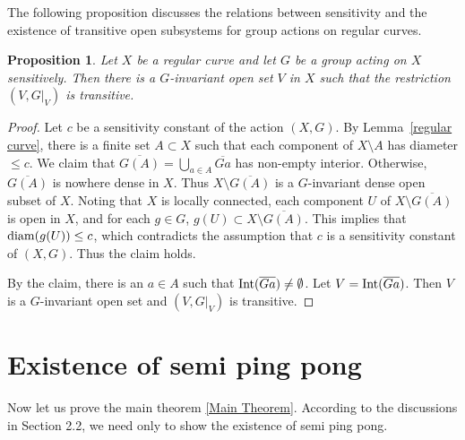 \documentclass[12pt,a4paper]{amsart}
\newtheorem{prop}[thm]{Proposition}
\theoremstyle{definition}
\numberwithin{equation}{section}
\begin{document}
The following proposition discusses the relations between sensitivity and the existence of transitive open subsystems for group actions on regular curves.

\begin{prop}\label{transitive open set}
Let $X$ be a regular curve and let $G$ be a group acting on $X$ sensitively. Then there is a $G$-invariant
open set $V$ in $X$ such that the restriction $(V, G|_V)$ is transitive.
\end{prop}

\begin{proof}
Let $c$ be a sensitivity constant of the action $(X,G)$. By Lemma~\ref{regular curve}, there is a finite set $A\subset X$ such that each component of $X\setminus A$
has diameter $\leq c$. We claim that $\overline{G(A)}=\bigcup_{a\in A}\overline{Ga}$ has non-empty interior. Otherwise,  $\overline{G(A)}$ is nowhere dense in $X$. Thus $X\setminus \overline{G(A)}$ is a $G$-invariant dense open subset of $X$. Noting that $X$ is locally connected, each component $U$ of $X\setminus \overline{G(A)}$ is
open in $X$, and for each $g\in G$, $g(U)\subset X\setminus\overline{G(A)}$. This implies that ${\rm diam}(g(U))\leq c$, which contradicts
the assumption that $c$ is a sensitivity constant of $(X,G)$. Thus the claim holds.

By the claim, there is an $a\in A$ such that ${\rm Int}(\overline{Ga})\neq\emptyset$. Let $V={\rm Int}(\overline{Ga})$. Then $V$ is a $G$-invariant open set and $(V,G|_V)$ is transitive.
\end{proof}



\section{Existence of semi ping pong}


Now let us prove the main theorem \ref{Main Theorem}. According to the discussions in Section 2.2, we need only to show the existence of semi ping pong.\vspace{2mm}


\end{document}

